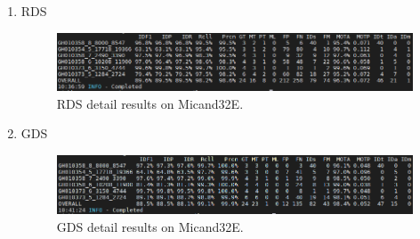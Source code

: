 \begin{enumerate}
\begin{figure}
	\end{figure}
	\item RDS
	\begin{figure}
		\centerline{\includegraphics[width=1\linewidth]{Figs/Evaluation/micand6/rds.png}}
		\caption{RDS detail results on Micand32E.}
	\end{figure}
	\item GDS
	\begin{figure}
		\centerline{\includegraphics[width=1\linewidth]{Figs/Evaluation/micand6/gds.png}}
		\caption{GDS detail results on Micand32E.}
	\end{figure}
\end{enumerate}

